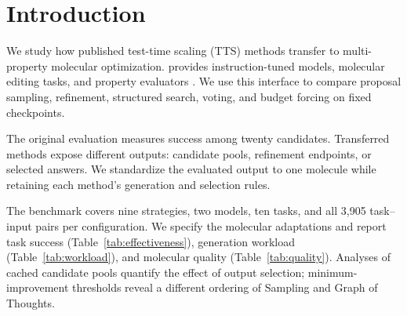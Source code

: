 \section{Introduction}
We study how published test-time scaling (TTS) methods transfer to multi-property molecular optimization. \gellmo{} provides instruction-tuned models, molecular editing tasks, and property evaluators \citep{gellmo2025}. We use this interface to compare proposal sampling, refinement, structured search, voting, and budget forcing on fixed checkpoints.

The original \gellmo{} evaluation measures success among twenty candidates. Transferred methods expose different outputs: candidate pools, refinement endpoints, or selected answers. We standardize the evaluated output to one molecule while retaining each method's generation and selection rules.

The benchmark covers nine strategies, two models, ten tasks, and all 3,905 task--input pairs per configuration. We specify the molecular adaptations and report task success (Table~\ref{tab:effectiveness}), generation workload (Table~\ref{tab:workload}), and molecular quality (Table~\ref{tab:quality}). Analyses of cached candidate pools quantify the effect of output selection; minimum-improvement thresholds reveal a different ordering of Sampling and Graph of Thoughts.
